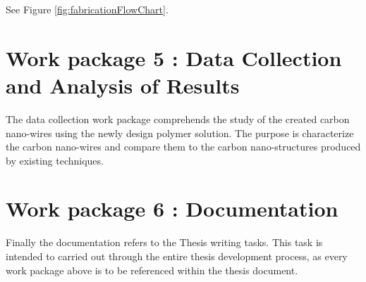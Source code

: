 See Figure \ref{fig:fabricationFlowChart}.
	
\section{Work package 5 : Data Collection and Analysis of Results}
The data collection work package comprehends the study of the created carbon nano-wires using the newly design polymer solution. The purpose is characterize the carbon nano-wires and compare them to the carbon nano-structures produced by existing techniques.

\section{Work package 6 : Documentation}
Finally the documentation refers to the Thesis writing tasks. This task is intended to carried out through the entire thesis development process, as every work package above is to be referenced within the thesis document.



